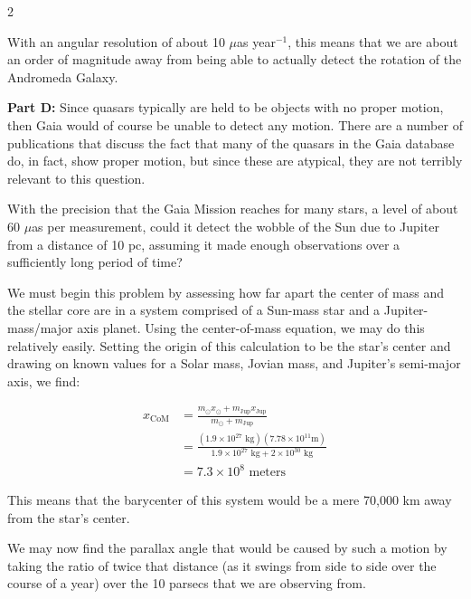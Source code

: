 \documentclass[12pt]{article}
\newenvironment{problem}[2][Problem]{\begin{trivlist}
\item[\hskip \labelsep {\bfseries #1}\hskip \labelsep {\bfseries #2.}]}{\end{trivlist}}
\newenvironment{answer}[2][Answer]{\begin{trivlist}
\item[\hskip \labelsep {\bfseries #1}\hskip \labelsep {\bfseries #2.}]}{\end{trivlist}}
\begin{document}
\begin{multicols*}{2}
\begin{answer}{5}
With an angular resolution of about 10 $\mu$as year$^{-1}$, this means that we are about an order of magnitude away from being able to actually detect the rotation of the Andromeda Galaxy.

\bigskip
\noindent \textbf{Part D: } Since quasars typically are held to be objects with no proper motion, then Gaia would of course be unable to detect any motion. There are a number of publications that discuss the fact that many of the quasars in the Gaia database do, in fact, show proper motion, but since these are atypical, they are not terribly relevant to this question.

\end{answer}


\begin{problem}{6} With the precision that the Gaia Mission reaches for many stars, a level of about 60 $\mu$as per measurement, could it detect the wobble of the Sun due to Jupiter from a distance of 10 pc, assuming it made enough observations over a sufficiently long period of time?

\end{problem}

\begin{answer}{6}
We must begin this problem by assessing how far apart the center of mass and the stellar core are in a system comprised of a Sun-mass star and a Jupiter-mass/major axis planet. Using the center-of-mass equation, we may do this relatively easily. Setting the origin of this calculation to be the star's center and drawing on known values for a Solar mass, Jovian mass, and Jupiter's semi-major axis, we find:

\begin{align*}
  x_{\text{CoM}} &= \frac{m_{\odot} x_{\odot} + m_{\text{Jup}} x_{\text{Jup}}}{m_{\odot} + m_{\text{Jup}}} \\
    &= \frac{(1.9 \times 10^{27} \text{ kg}) (7.78 \times 10^{11} \text{m})}{1.9 \times 10^{27} \text{ kg} + 2 \times 10^{30} \text{ kg}} \\
    &= 7.3 \times 10^8 \text{ meters}
\end{align*}

This means that the barycenter of this system would be a mere 70,000 km away from the star's center.

We may now find the parallax angle that would be caused by such a motion by taking the ratio of twice that distance (as it swings from side to side over the course of a year) over the 10 parsecs that we are observing from.


\end{answer}
\end{multicols*}
\end{document}
